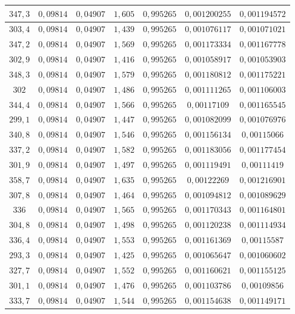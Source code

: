 \documentclass[]{article}
\begin{document}
\begin{table}
\begin{tabular}{||c|c|c|c|c|c|c||}
    $347,3$ & $0,09814$ & $0,04907$ & $1,605$ & $0,995265$ & $0,001200255$ & $0,001194572$ \\\hline
    $303,4$ & $0,09814$ & $0,04907$ & $1,439$ & $0,995265$ & $0,001076117$ & $0,001071021$ \\\hline
    $347,2$ & $0,09814$ & $0,04907$ & $1,569$ & $0,995265$ & $0,001173334$ & $0,001167778$ \\\hline
    $302,9$ & $0,09814$ & $0,04907$ & $1,416$ & $0,995265$ & $0,001058917$ & $0,001053903$ \\\hline
    $348,3$ & $0,09814$ & $0,04907$ & $1,579$ & $0,995265$ & $0,001180812$ & $0,001175221$ \\\hline
    $302  $ & $0,09814$ & $0,04907$ & $1,486$ & $0,995265$ & $0,001111265$ & $0,001106003$ \\\hline
    $344,4$ & $0,09814$ & $0,04907$ & $1,566$ & $0,995265$ & $0,00117109 $ & $0,001165545$ \\\hline
    $299,1$ & $0,09814$ & $0,04907$ & $1,447$ & $0,995265$ & $0,001082099$ & $0,001076976$ \\\hline
    $340,8$ & $0,09814$ & $0,04907$ & $1,546$ & $0,995265$ & $0,001156134$ & $0,00115066 $ \\\hline
    $337,2$ & $0,09814$ & $0,04907$ & $1,582$ & $0,995265$ & $0,001183056$ & $0,001177454$ \\\hline
    $301,9$ & $0,09814$ & $0,04907$ & $1,497$ & $0,995265$ & $0,001119491$ & $0,00111419 $ \\\hline
    $358,7$ & $0,09814$ & $0,04907$ & $1,635$ & $0,995265$ & $0,00122269 $ & $0,001216901$ \\\hline
    $307,8$ & $0,09814$ & $0,04907$ & $1,464$ & $0,995265$ & $0,001094812$ & $0,001089629$ \\\hline
    $336  $ & $0,09814$ & $0,04907$ & $1,565$ & $0,995265$ & $0,001170343$ & $0,001164801$ \\\hline
    $304,8$ & $0,09814$ & $0,04907$ & $1,498$ & $0,995265$ & $0,001120238$ & $0,001114934$ \\\hline
    $336,4$ & $0,09814$ & $0,04907$ & $1,553$ & $0,995265$ & $0,001161369$ & $0,00115587 $ \\\hline
    $293,3$ & $0,09814$ & $0,04907$ & $1,425$ & $0,995265$ & $0,001065647$ & $0,001060602$ \\\hline
    $327,7$ & $0,09814$ & $0,04907$ & $1,552$ & $0,995265$ & $0,001160621$ & $0,001155125$ \\\hline
    $301,1$ & $0,09814$ & $0,04907$ & $1,476$ & $0,995265$ & $0,001103786$ & $0,00109856 $ \\\hline
    $333,7$ & $0,09814$ & $0,04907$ & $1,544$ & $0,995265$ & $0,001154638$ & $0,001149171$ \\\hline


\end{tabular}
\end{table}
\end{document}
